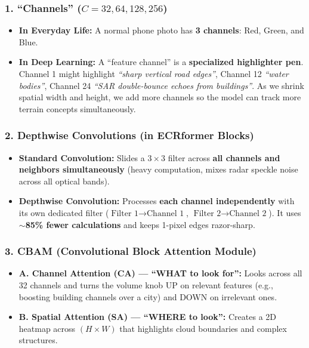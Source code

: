\documentclass[11pt,a4paper]{article}
\begin{document}
\subsubsection*{1. ``Channels'' ($C = 32, 64, 128, 256$)}
\begin{itemize}[leftmargin=1.5em]
    \item \textbf{In Everyday Life:} A normal phone photo has \textbf{3 channels}: Red, Green, and Blue.
    \item \textbf{In Deep Learning:} A ``feature channel'' is a \textbf{specialized highlighter pen}. Channel 1 might highlight \textit{``sharp vertical road edges''}, Channel 12 \textit{``water bodies''}, Channel 24 \textit{``SAR double-bounce echoes from buildings''}. As we shrink spatial width and height, we add more channels so the model can track more terrain concepts simultaneously.
\end{itemize}

\subsubsection*{2. Depthwise Convolutions (in ECRformer Blocks)}
\begin{itemize}[leftmargin=1.5em]
    \item \textbf{Standard Convolution:} Slides a $3\times 3$ filter across \textbf{all channels and neighbors simultaneously} (heavy computation, mixes radar speckle noise across all optical bands).
    \item \textbf{Depthwise Convolution:} Processes \textbf{each channel independently} with its own dedicated filter ($\text{Filter 1} \to \text{Channel 1}$, $\text{Filter 2} \to \text{Channel 2}$). It uses \textbf{$\sim$85\% fewer calculations} and keeps 1-pixel edges razor-sharp.
\end{itemize}

\subsubsection*{3. CBAM (Convolutional Block Attention Module)}
\begin{itemize}[leftmargin=1.5em]
    \item \textbf{A. Channel Attention (CA) --- ``WHAT to look for'':} Looks across all 32 channels and turns the volume knob UP on relevant features (e.g., boosting building channels over a city) and DOWN on irrelevant ones.
    \item \textbf{B. Spatial Attention (SA) --- ``WHERE to look'':} Creates a 2D heatmap across $(H \times W)$ that highlights cloud boundaries and complex structures.
\end{itemize}
\end{document}

